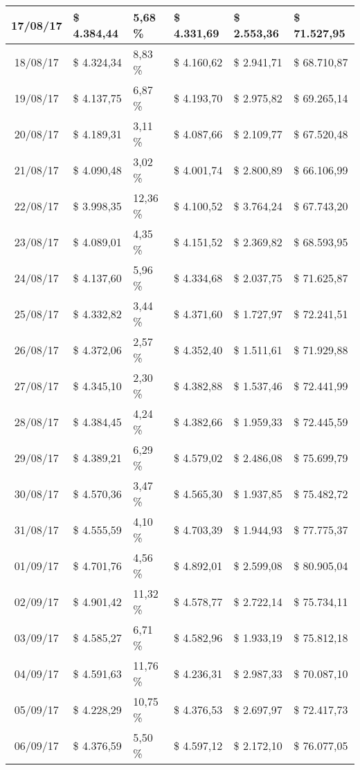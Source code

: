 \begin{small}
\begin{longtable}{|c|l|l|l|l|l|}
17/08/17 & \$ 4.384,44 & 5,68 \% & \$ 4.331,69 & \$ 2.553,36 & \$ 71.527,95 \\ \hline
18/08/17 & \$ 4.324,34 & 8,83 \% & \$ 4.160,62 & \$ 2.941,71 & \$ 68.710,87 \\ \hline
19/08/17 & \$ 4.137,75 & 6,87 \% & \$ 4.193,70 & \$ 2.975,82 & \$ 69.265,14 \\ \hline
20/08/17 & \$ 4.189,31 & 3,11 \% & \$ 4.087,66 & \$ 2.109,77 & \$ 67.520,48 \\ \hline
21/08/17 & \$ 4.090,48 & 3,02 \% & \$ 4.001,74 & \$ 2.800,89 & \$ 66.106,99 \\ \hline
22/08/17 & \$ 3.998,35 & 12,36 \% & \$ 4.100,52 & \$ 3.764,24 & \$ 67.743,20 \\ \hline
23/08/17 & \$ 4.089,01 & 4,35 \% & \$ 4.151,52 & \$ 2.369,82 & \$ 68.593,95 \\ \hline
24/08/17 & \$ 4.137,60 & 5,96 \% & \$ 4.334,68 & \$ 2.037,75 & \$ 71.625,87 \\ \hline
25/08/17 & \$ 4.332,82 & 3,44 \% & \$ 4.371,60 & \$ 1.727,97 & \$ 72.241,51 \\ \hline
26/08/17 & \$ 4.372,06 & 2,57 \% & \$ 4.352,40 & \$ 1.511,61 & \$ 71.929,88 \\ \hline
27/08/17 & \$ 4.345,10 & 2,30 \% & \$ 4.382,88 & \$ 1.537,46 & \$ 72.441,99 \\ \hline
28/08/17 & \$ 4.384,45 & 4,24 \% & \$ 4.382,66 & \$ 1.959,33 & \$ 72.445,59 \\ \hline
29/08/17 & \$ 4.389,21 & 6,29 \% & \$ 4.579,02 & \$ 2.486,08 & \$ 75.699,79 \\ \hline
30/08/17 & \$ 4.570,36 & 3,47 \% & \$ 4.565,30 & \$ 1.937,85 & \$ 75.482,72 \\ \hline
31/08/17 & \$ 4.555,59 & 4,10 \% & \$ 4.703,39 & \$ 1.944,93 & \$ 77.775,37 \\ \hline
01/09/17 & \$ 4.701,76 & 4,56 \% & \$ 4.892,01 & \$ 2.599,08 & \$ 80.905,04 \\ \hline
02/09/17 & \$ 4.901,42 & 11,32 \% & \$ 4.578,77 & \$ 2.722,14 & \$ 75.734,11 \\ \hline
03/09/17 & \$ 4.585,27 & 6,71 \% & \$ 4.582,96 & \$ 1.933,19 & \$ 75.812,18 \\ \hline
04/09/17 & \$ 4.591,63 & 11,76 \% & \$ 4.236,31 & \$ 2.987,33 & \$ 70.087,10 \\ \hline
05/09/17 & \$ 4.228,29 & 10,75 \% & \$ 4.376,53 & \$ 2.697,97 & \$ 72.417,73 \\ \hline
06/09/17 & \$ 4.376,59 & 5,50 \% & \$ 4.597,12 & \$ 2.172,10 & \$ 76.077,05 \\ \hline

\end{longtable}
\end{small}
